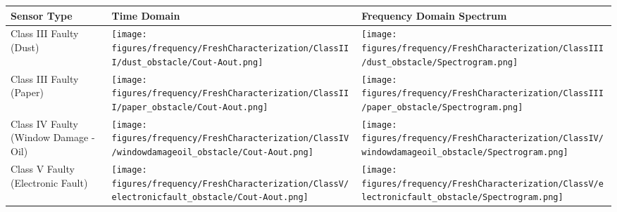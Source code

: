 \begin{table*}[htb]
  \centering
    \begin{tabular}{| p{2cm}| m{7cm} | m{7cm} | }
        \hline
        \bfseries Sensor Type & 
        \bfseries Time Domain &  
        \bfseries Frequency Domain Spectrum \\ \hline 
        
        \hline
        Class III Faulty  (Dust) &         
        \begin{minipage}{.35\textwidth}
        \texttt{[image: figures/frequency/FreshCharacterization/ClassIII/dust\_obstacle/Cout-Aout.png]}
        \end{minipage} & 
        \begin{minipage}{.35\textwidth}
        \texttt{[image: figures/frequency/FreshCharacterization/ClassIII/dust\_obstacle/Spectrogram.png]}
        \end{minipage} \\
        
        \hline
        Class III Faulty  (Paper) &         
        \begin{minipage}{.35\textwidth}
        \texttt{[image: figures/frequency/FreshCharacterization/ClassIII/paper\_obstacle/Cout-Aout.png]}
        \end{minipage} & 
        \begin{minipage}{.35\textwidth}
        \texttt{[image: figures/frequency/FreshCharacterization/ClassIII/paper\_obstacle/Spectrogram.png]}
        \end{minipage} \\
        
        \hline
        Class IV Faulty  (Window Damage - Oil) &         
        \begin{minipage}{.35\textwidth}
        \texttt{[image: figures/frequency/FreshCharacterization/ClassIV/windowdamageoil\_obstacle/Cout-Aout.png]}
        \end{minipage} & 
        \begin{minipage}{.35\textwidth}
        \texttt{[image: figures/frequency/FreshCharacterization/ClassIV/windowdamageoil\_obstacle/Spectrogram.png]}
        \end{minipage} \\
        
        \hline
        Class V Faulty  (Electronic Fault) &         
        \begin{minipage}{.35\textwidth}
        \texttt{[image: figures/frequency/FreshCharacterization/ClassV/electronicfault\_obstacle/Cout-Aout.png]}
        \end{minipage} & 
        \begin{minipage}{.35\textwidth}
        \texttt{[image: figures/frequency/FreshCharacterization/ClassV/electronicfault\_obstacle/Spectrogram.png]}
        \end{minipage} \\
        \hline 
        


\end{tabular}
\end{table*}
